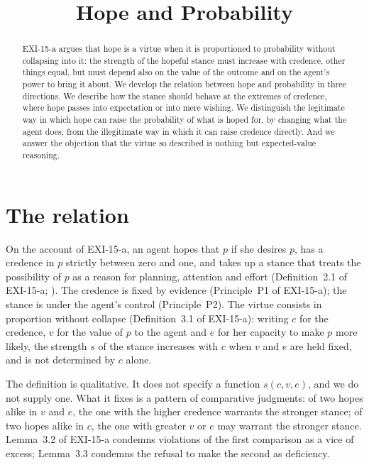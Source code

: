 \documentclass{situationist-preprint}
\title{Hope and Probability}
\begin{document}
\maketitle

\begin{abstract}
EXI-15-a argues that hope is a virtue when it is proportioned to probability without collapsing into it: the strength of the hopeful stance must increase with credence, other things equal, but must depend also on the value of the outcome and on the agent's power to bring it about. We develop the relation between hope and probability in three directions. We describe how the stance should behave at the extremes of credence, where hope passes into expectation or into mere wishing. We distinguish the legitimate way in which hope can raise the probability of what is hoped for, by changing what the agent does, from the illegitimate way in which it can raise credence directly. And we answer the objection that the virtue so described is nothing but expected-value reasoning.
\end{abstract}

\section{The relation}

On the account of EXI-15-a, an agent hopes that $p$ if she desires $p$, has a credence in $p$ strictly between zero and one, and takes up a stance that treats the possibility of $p$ as a reason for planning, attention and effort (Definition~2.1 of EXI-15-a; \citealp{Bovens1999,Martin2014}). The credence is fixed by evidence (Principle~P1 of EXI-15-a); the stance is under the agent's control (Principle~P2). The virtue consists in proportion without collapse (Definition~3.1 of EXI-15-a): writing $c$ for the credence, $v$ for the value of $p$ to the agent and $e$ for her capacity to make $p$ more likely, the strength $s$ of the stance increases with $c$ when $v$ and $e$ are held fixed, and is not determined by $c$ alone.

The definition is qualitative. It does not specify a function $s(c,v,e)$, and we do not supply one. What it fixes is a pattern of comparative judgments: of two hopes alike in $v$ and $e$, the one with the higher credence warrants the stronger stance; of two hopes alike in $c$, the one with greater $v$ or $e$ may warrant the stronger stance. Lemma~3.2 of EXI-15-a condemns violations of the first comparison as a vice of excess; Lemma~3.3 condemns the refusal to make the second as deficiency.
\end{document}
